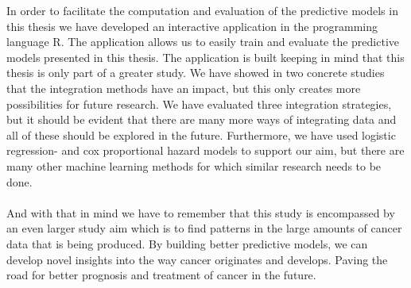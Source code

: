 In order to facilitate the computation and evaluation of the predictive models in this thesis we have developed an interactive application in the programming language R. The application allows us to easily train and evaluate the predictive models presented in this thesis. The application is built keeping in mind that this thesis is only part of a greater study. We have showed in two concrete studies that the integration methods have an impact, but this only creates more possibilities for future research. We have evaluated three integration strategies, but it should be evident that there are many more ways of integrating data and all of these should be explored in the future. Furthermore, we have used logistic regression- and cox proportional hazard models to support our aim, but there are many other machine learning methods for which similar research needs to be done. \\ \\
And with that in mind we have to remember that this study is encompassed by an even larger study aim which is to find patterns in the large amounts of cancer data that is being produced. By building better predictive models, we can develop novel insights into the way cancer originates and develops. Paving the road for better prognosis and treatment of cancer in the future.

